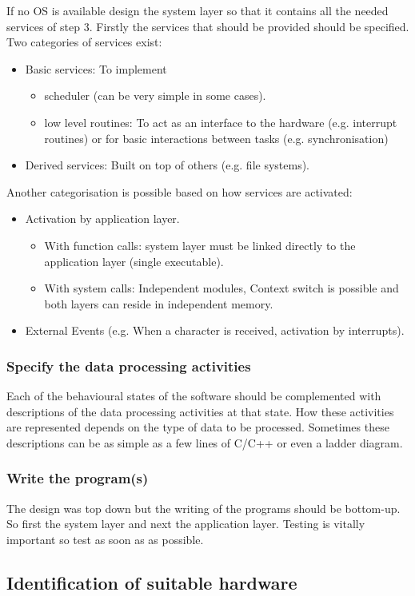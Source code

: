 \documentclass[../main.tex]{subfiles}
\begin{document}
If no OS is available design the system layer so that it contains all the needed services of step 3.
Firstly the services that should be provided should be specified. 
Two categories of services exist: 
\begin{itemize}
	\item Basic services: To implement
	\begin{itemize}
		\item scheduler (can be very simple in some cases).
		\item low level routines: To act as an interface to the hardware (e.g. interrupt routines) or for basic interactions between tasks (e.g. synchronisation)
	\end{itemize}
	
	\item Derived services: Built on top of others (e.g. file systems).
\end{itemize}

Another categorisation is possible based on how services are activated: 
\begin{itemize}
	\item Activation by application layer. 
	\begin{itemize}
		\item With function calls: system layer must be linked directly to the application layer (single executable). 
		\item With system calls: Independent modules, Context switch is possible and both layers can reside in independent memory.  
	\end{itemize}
	\item External Events (e.g. When a character is received, activation by interrupts). 
\end{itemize}

\subsubsection{Specify the data processing activities}
\label{sss:activities}
Each of the behavioural states of the software should be complemented with descriptions of the data processing activities at that state.
How these activities are represented depends on the type of data to be processed.
Sometimes these descriptions can be as simple as a few lines of C/C++ or even a ladder diagram.




\subsubsection{Write the program(s)}
\label{sss:write}
The design was top down but the writing of the programs should be bottom-up. So first the system layer and next the application layer. 
Testing is vitally important so test as soon as as possible.

\subsection{Identification of suitable hardware}
\end{document}
